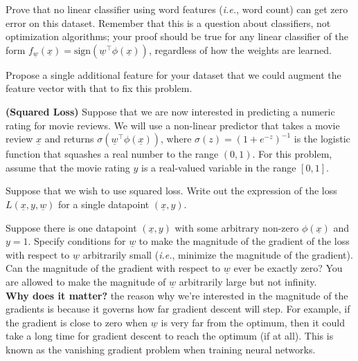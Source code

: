 \documentclass{article}
\theoremstyle{definition}
\begin{document}
\begin{question}
\begin{question}
		Prove that no linear classifier using word features (\textit{i.e.}, word count) can get zero error on this dataset. Remember that this is a question about classifiers, not optimization algorithms; your proof should be true for any linear classifier of the form $f_{\underline{w}}(\underline{x})=\text{sign}(\underline{w}^\top\phi(\underline{x}))$, regardless of how the weights are learned.
		
		Propose a single additional feature for your dataset that we could augment the feature vector with that to fix this problem.
	\end{question}
	
	\item \textbf{(Squared Loss)} Suppose that we are now interested in predicting a numeric rating for movie reviews. We will use a non-linear predictor that takes a movie review $\underline{x}$ and returns $\sigma(\underline{w}^\top\phi(\underline{x}))$, where $\sigma(z)=(1+e^{-z})^{-1}$ is the logistic function that squashes a real number to the range $(0,1)$. For this problem, assume that the movie rating $y$ is a real-valued variable in the range $[0,1]$.
	\begin{question}
		\item Suppose that we wish to use squared loss. Write out the expression of the loss $L(\underline{x},y,\underline{w})$ for a single datapoint $(\underline{x},y)$.
		\item Suppose there is one datapoint $(\underline{x},y)$ with some arbitrary non-zero $\phi(\underline{x})$ and $y=1$. Specify conditions for $\underline{w}$ to make the magnitude of the gradient of the loss with respect to $\underline{w}$ arbitrarily small (\textit{i.e.}, minimize the magnitude of the gradient). Can the magnitude of the gradient with respect to $\underline{w}$ ever be exactly zero? You are allowed to make the magnitude of $\underline{w}$ arbitrarily large but not infinity.\\
		
		\textbf{Why does it matter?} the reason why we're interested in the magnitude of the gradients is because it governs how far gradient descent will step. For example, if the gradient is close to zero when $\underline{w}$ is very far from the optimum, then it could take a long time for gradient descent to reach the optimum (if at all). This is known as the vanishing gradient problem when training neural networks.
	\end{question}
\end{question}
\end{document}
